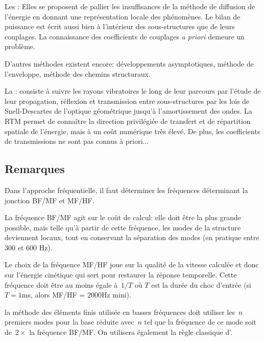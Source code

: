 \bigskip
Les :
Elles se proposent de pallier les insuffisances de la méthode de diffusion de l'énergie
en donnant une représentation locale des phénomènes. Le bilan de puissance est
écrit aussi bien à l'intérieur des sous-structures que de leurs couplages.
La connaissance des coefficients de couplages \emph{a priori} demeure un problème.

\bigskip
D'autres méthodes existent encore: développements asymptotiques,
méthode de l'enveloppe, méthode des chemins structuraux.

La :
consiste à suivre les rayons vibratoires le long
de leur parcours par l'étude de leur propagation, réflexion et transmission
entre sous-structures par les lois de Snell-Descartes
de l'optique géométrique jusqu'à l'amortissement des ondes.
La RTM permet de connaître la direction privilégiée de transfert et de
répartition spatiale de l'énergie, mais à un coût numérique très
élevé. De plus, les coefficients de transmissions ne sont pas connus à priori...

\medskip
\subsection{Remarques}
Dans l'approche fréquentielle, il faut déterminer les fréquences déterminant
la jonction BF/MF et MF/HF.

La fréquence BF/MF agit sur le coût de calcul: elle doit être la plus grande possible, mais
telle qu'à partir de cette fréquence, les modes de la structure deviennent locaux,
tout en conservant la séparation des modes (en pratique entre 300 et 600 Hz).

Le choix de la fréquence MF/HF joue sur la qualité de la vitesse calculée
et donc sur l'énergie cinétique qui sert pour restaurer la réponse
temporelle. Cette fréquence doit être au moins égale à~$1/T$ où
$T$ est la durée du choc d'entrée (si~$T=1$ms, alors MF/HF = 2000Hz mini).

la méthode des éléments finis utilisée en basses fréquences doit utiliser les~$n$ premiers modes pour la base réduite avec~$n$ tel que la fréquence de ce mode soit de~$2\times$ la fréquence BF/MF. On utilisera également la règle classique d'.

